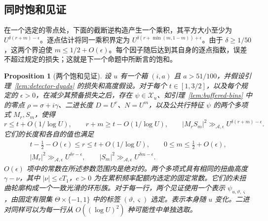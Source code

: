 \documentclass[11pt,a4paper]{article}
\numberwithin{equation}{section}
\numberwithin{figure}{section}
\newtheorem{proposition}[theorem]{Proposition}
\theoremstyle{definition}
\theoremstyle{remark}
\begin{document}
\subsection{同时饱和见证}

在一个选定的零点处，下面的截断逆构造产生一个乘积，其平方大小至少为 $U^{\delta(r+m)-\epsilon}$。逐点估计将同一乘积界定为 $U^{\delta(r+\min(m,1-m))+\epsilon}$。由于 $\delta\ge1/50$，这两个界迫使 $m\le1/2+O(\epsilon)$。每个因子随后达到其自身的逐点指数，误差不超过规定的损失；这就是下一个命题中所断言的饱和。

\begin{proposition}[两个饱和见证]\label{prop:detector-witness}
设 \(u\) 有一个箱 \((i,a)\) 且 \(a>51/100\)，并假设引理~\ref{lem:detector-dyads} 的损失和高度假设。对于每个 \(t\in[1,3/2]\)，以及每个规定的 \(\epsilon>0\)，在减少其预备损失之后，存在 \(\psi\in\mathcal X_u\)、如引理~\ref{lem:buffered-bins} 中的零点 \(\rho=\sigma+i\gamma\)、二进长度 \(D=U^r\)、\(N=U^m\)，以及公共行特征 \(\psi\) 的两个多项式 \(M_r,S_m\)，使得
\begin{equation}\label{eq:detector-note}
 r\le t+O(1/\log U),\qquad
 r+m\ge t-O(1/\log U),\qquad
 |M_rS_m|^2\gg_{\mathcal A,\epsilon}
 U^{\delta(r+m)-\epsilon}.
\end{equation}
它们的长度和各自的值也满足
\begin{equation}\label{eq:saturated-witness}
 \begin{gathered}
 t-\tfrac12-O(\epsilon)\le r\le t+O(1/\log U),
 \qquad 0\le m\le\tfrac12+O(\epsilon),\\
 |M_r|^2\gg_{\mathcal A,\epsilon}U^{\delta r-\epsilon},
 \qquad
 |S_m|^2\gg_{\mathcal A,\epsilon}U^{\delta m-\epsilon}.
 \end{gathered}
\end{equation}
\(O(\epsilon)\) 项中的常数在所述参数范围内是绝对的。两个多项式具有相同的扭曲高度 \(\gamma-\nu\)，其中 \(|\nu|\le cT_1\)，\(c>0\) 为在累积频率配额内选定的固定常数。它们的未扭曲轮廓构成一个一致光滑的环形族。对于每一行，两个见证使用一个表示 \(\psi_{u,\vartheta,\varsigma}\)，由固定有限集 \(\Theta\times\{-1,1\}\) 中的标签 \((\vartheta,\varsigma)\) 选定。表示本身随 \(u\) 变化。二进对同样可以为每一行从 \(O((\log U)^2)\) 种可能性中单独选取。
\end{proposition}
\end{document}
